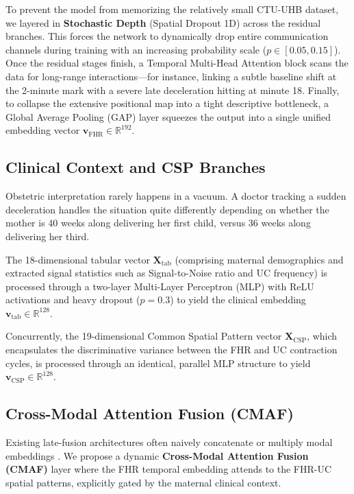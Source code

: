 \documentclass[conference]{IEEEtran}
\begin{document}
To prevent the model from memorizing the relatively small CTU-UHB dataset, we layered in \textbf{Stochastic Depth} (Spatial Dropout 1D) across the residual branches. This forces the network to dynamically drop entire communication channels during training with an increasing probability scale ($p \in [0.05, 0.15]$). Once the residual stages finish, a Temporal Multi-Head Attention block scans the data for long-range interactions---for instance, linking a subtle baseline shift at the 2-minute mark with a severe late deceleration hitting at minute 18. Finally, to collapse the extensive positional map into a tight descriptive bottleneck, a Global Average Pooling (GAP) layer squeezes the output into a single unified embedding vector $\mathbf{v}_{\text{FHR}} \in \mathbb{R}^{192}$.

\subsection{Clinical Context and CSP Branches}
Obstetric interpretation rarely happens in a vacuum. A doctor tracking a sudden deceleration handles the situation quite differently depending on whether the mother is 40 weeks along delivering her first child, versus 36 weeks along delivering her third. 

The 18-dimensional tabular vector $\mathbf{X}_{\text{tab}}$ (comprising maternal demographics and extracted signal statistics such as Signal-to-Noise ratio and UC frequency) is processed through a two-layer Multi-Layer Perceptron (MLP) with ReLU activations and heavy dropout ($p=0.3$) to yield the clinical embedding $\mathbf{v}_{\text{tab}} \in \mathbb{R}^{128}$. 

Concurrently, the 19-dimensional Common Spatial Pattern vector $\mathbf{X}_{\text{CSP}}$, which encapsulates the discriminative variance between the FHR and UC contraction cycles, is processed through an identical, parallel MLP structure to yield $\mathbf{v}_{\text{CSP}} \in \mathbb{R}^{128}$.

\subsection{Cross-Modal Attention Fusion (CMAF)}
Existing late-fusion architectures often naively concatenate or multiply modal embeddings \cite{mendis2023}. We propose a dynamic \textbf{Cross-Modal Attention Fusion (CMAF)} layer where the FHR temporal embedding attends to the FHR-UC spatial patterns, explicitly gated by the maternal clinical context.
\end{document}
